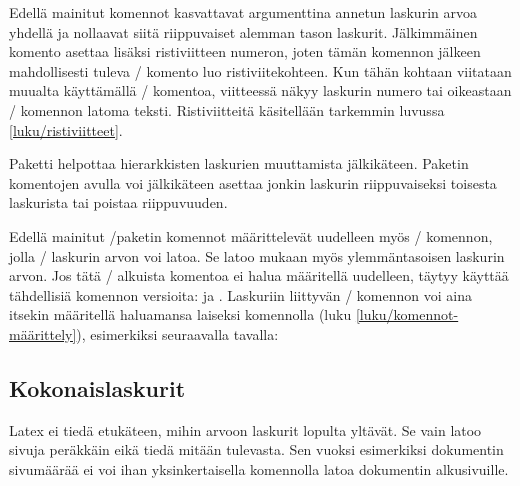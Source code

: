 \noindent
Edellä mainitut komennot kasvattavat argumenttina annetun laskurin arvoa
yhdellä ja nollaavat siitä riippuvaiset alemman tason laskurit.
Jälkimmäinen komento  asettaa lisäksi
ristiviitteen numeron, joten tämän komennon jälkeen mahdollisesti tuleva
\-/ komento luo ristiviitekohteen. Kun tähän kohtaan
viitataan muualta käyttämällä \-/ komentoa, viitteessä
näkyy laskurin numero tai oikeastaan \-/ komennon
latoma teksti. Ristiviitteitä käsitellään tarkemmin luvussa
\ref{luku/ristiviitteet}.

Paketti  helpottaa hierarkkisten laskurien
muuttamista jälkikäteen. Paketin komentojen avulla voi jälkikäteen
asettaa jonkin laskurin riippuvaiseksi toisesta laskurista tai poistaa
riippuvuuden.

\begin{koodilohkosis}
\end{koodilohkosis}

\noindent
Edellä mainitut \-/paketin komennot määrittelevät
uudelleen myös \-/ komennon, jolla \-/
laskurin arvon voi latoa. Se latoo mukaan myös ylemmäntasoisen laskurin
arvon. Jos tätä \-/ alkuista komentoa ei halua määritellä
uudelleen, täytyy käyttää tähdellisiä komennon versioita:
 ja . Laskuriin
liittyvän \-/ komennon voi aina itsekin määritellä
haluamansa laiseksi komennolla  (luku
\ref{luku/komennot-määrittely}), esimerkiksi seuraavalla tavalla:

\begin{koodilohkosis}
\renewcommand{\theoma}{\arabic{page}/\alph{oma}}
\end{koodilohkosis}

\subsection{Kokonaislaskurit}

Latex ei tiedä etukäteen, mihin arvoon laskurit lopulta yltävät. Se vain
latoo sivuja peräkkäin eikä tiedä mitään tulevasta. Sen vuoksi
esimerkiksi dokumentin sivumäärää ei voi ihan yksinkertaisella
komennolla latoa dokumentin alkusivuille.

